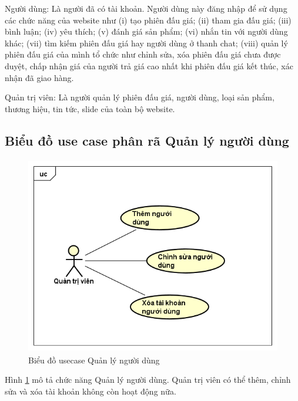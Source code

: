 \documentclass[../DoAn.tex]{subfiles}
\begin{document}
Người dùng: Là người đã có tài khoản. Người dùng này đăng nhập để sử dụng các chức năng của website như (i) tạo phiên đấu giá; (ii) tham gia đấu giá; (iii) bình luận; (iv) yêu thích; (v) đánh giá sản phẩm; (vi) nhắn tin với người dùng khác; (vii) tìm kiếm phiên đấu giá hay người dùng ở thanh chat; (viii) quản lý phiên đấu giá của mình tổ chức như chỉnh sửa, xóa phiên đấu giá chưa được duyệt, chấp nhận giá của người trả giá cao nhất khi phiên đấu giá kết thúc, xác nhận đã giao hàng.

Quản trị viên: Là người quản lý phiên đấu giá, người dùng, loại sản phẩm, thương hiệu, tin tức, slide của toàn bộ website. 
\subsection{Biểu đồ use case phân rã Quản lý người dùng}
\begin{figure}[H]
    \centering
    \includegraphics[width=0.75\linewidth,height=8.67cm]{Hinhve/uc quản lý người dùng.png}
    \caption{Biểu đồ usecase Quản lý người dùng}
    \label{fig:Fig22}
\end{figure}
Hình \ref{fig:Fig22} mô tả chức năng Quản lý người dùng. Quản trị viên có thể thêm, chỉnh sửa và xóa tài khoản không còn hoạt động nữa.
\end{document}
